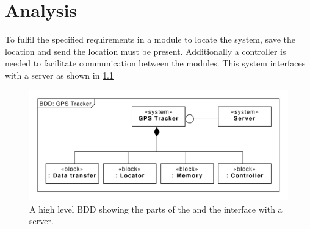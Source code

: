 
\chapter{Analysis}
\label{chap:analysis}
To fulfil the specified requirements in  a module to locate the system, save the location and send the location must be present.
Additionally a controller is needed to facilitate communication between the modules.
This system interfaces with a server as shown in \cref{fig:BDD:unspecified}

\begin{figure}[H]
	\centering
	\includegraphics[width=0.7\linewidth]{gfx/Design/BDD_Unspecified.pdf}
	\caption{A high level BDD showing the parts of the \systemName and the interface with a server.}
	\label{fig:BDD:unspecified}
\end{figure}


\FloatBarrier

